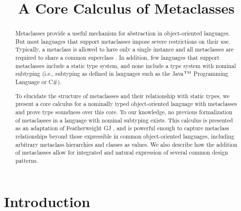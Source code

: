 \documentclass[nocopyrightspace,10pt]{acm-sigplan}
\begin{document}
\title{A Core Calculus of Metaclasses}



\maketitle


\begin{abstract}
Metaclasses provide a useful mechanism for abstraction in
object-oriented languages.  But most languages that support metaclasses
 impose severe restrictions on their use. Typically, a metaclass
is allowed to have only a single instance and all metaclasses are
required to share a common superclass \cite{objvlisp}. In addition,
few languages that support metaclasses include a static type
system, and none include a type system with nominal subtyping
(i.e., subtyping as defined in languages such as the
Java${^{\mbox{\tiny{TM}}}}$ Programming Language or C\#).

To elucidate the structure of metaclasses and their relationship with
static types, we present a core calculus for a nominally typed
object-oriented language with metaclasses and prove type soundness
over this core.  To our knowledge, no previous formalization of
metaclasses in a language with nominal subtyping exists.  This
calculus is presented as an adaptation of Featherweight GJ \cite{FJ},
and is powerful enough to capture metaclass relationships beyond those
expressible in common object-oriented languages, including arbitrary
metaclass hierarchies and classes as values.  We also describe how the
addition of metaclasses allow for integrated and natural expression of
several common design patterns.
\end{abstract}

\section{Introduction}
\end{document}
